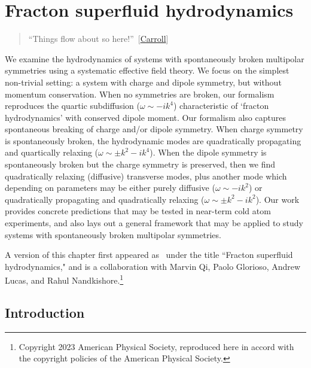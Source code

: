 
\chapter{Fracton superfluid hydrodynamics }\label{chp:superfluids}

\begin{quotation}
	 “Things flow about so here!”~[\hyperlink{cite.\therefsection @Carroll2002Alice}{Carroll}]
\end{quotation}

We examine the hydrodynamics of systems with spontaneously broken multipolar symmetries using a systematic effective field theory. We focus on the simplest non-trivial setting: a system with charge and dipole symmetry, but without momentum conservation. When no symmetries are broken, our formalism reproduces the quartic subdiffusion ($\omega \sim -i k^4$) characteristic of `fracton hydrodynamics' with conserved dipole moment. Our formalism also captures spontaneous breaking of charge and/or dipole symmetry. When charge symmetry is spontaneously broken, the hydrodynamic modes are quadratically propagating and quartically relaxing ($\omega \sim \pm k^2 - ik^4$). When the dipole symmetry is spontaneously broken but the charge symmetry is preserved, then we find quadratically relaxing (diffusive) transverse modes, plus another mode which depending on parameters may be either purely diffusive ($\omega \sim -i k^2$) or quadratically propagating and quadratically relaxing ($\omega \sim \pm k^2 -i k^2$). Our work provides concrete predictions that may be tested in near-term cold atom experiments, and also lays out a general framework that may be applied to study systems with spontaneously broken multipolar symmetries. 

A version of this chapter first appeared as~\cite{Stahl2023Fracton} under the title ``Fracton superfluid hydrodynamics," and is a collaboration with Marvin Qi, Paolo Glorioso, Andrew Lucas, and Rahul Nandkishore.\footnote{Copyright 2023 American Physical Society, reproduced here in accord with the copyright policies of the American Physical Society.}



\section{Introduction}

